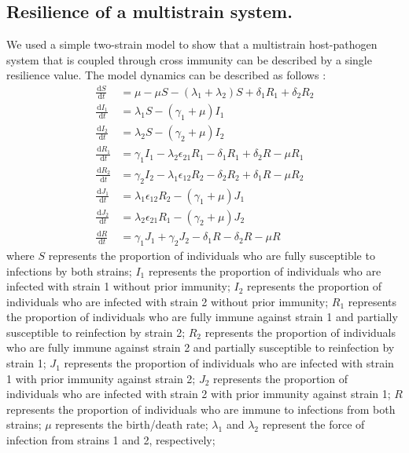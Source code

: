 \documentclass[12pt]{article}
\newcommand{\dd}[1]{\ensuremath{\, \mathrm{d}#1}}
\begin{document}
\subsection*{Resilience of a multistrain system.}

We used a simple two-strain model to show that a multistrain host-pathogen system that is coupled through cross immunity can be described by a single resilience value.
The model dynamics can be described as follows \citep{bhattacharyya2015cross}: 
\begin{align}
\frac{\dd S}{\dd t} &= \mu - \mu S - (\lambda_1 + \lambda_2) S + \delta_1 R_1 + \delta_2 R_2 \\
\frac{\dd I_1}{\dd t} &= \lambda_1 S - (\gamma_1 + \mu) I_1 \\
\frac{\dd I_2}{\dd t} &= \lambda_2 S - (\gamma_2 + \mu) I_2 \\
\frac{\dd R_1}{\dd t} &= \gamma_1 I_1 - \lambda_2 \epsilon_{21} R_1 - \delta_1 R_1 + \delta_2 R - \mu R_1\\
\frac{\dd R_2}{\dd t} &= \gamma_2 I_2 - \lambda_1 \epsilon_{12} R_2 - \delta_2 R_2 + \delta_1 R - \mu R_2\\
\frac{\dd J_1}{\dd t} &= \lambda_1 \epsilon_{12} R_2 - (\gamma_1 + \mu) J_1\\
\frac{\dd J_2}{\dd t} &= \lambda_2 \epsilon_{21} R_1 - (\gamma_2 + \mu) J_2\\
\frac{\dd R}{\dd t} &= \gamma_1 J_1 + \gamma_2 J_2 - \delta_1 R - \delta_2 R - \mu R
\end{align}
where $S$ represents the proportion of individuals who are fully susceptible to infections by both strains;
$I_1$ represents the proportion of individuals who are infected with strain 1 without prior immunity;
$I_2$ represents the proportion of individuals who are infected with strain 2 without prior immunity;
$R_1$ represents the proportion of individuals who are fully immune against strain 1 and partially susceptible to reinfection by strain 2;
$R_2$ represents the proportion of individuals who are fully immune against strain 2 and partially susceptible to reinfection by strain 1;
$J_1$ represents the proportion of individuals who are infected with strain 1 with prior immunity against strain 2;
$J_2$ represents the proportion of individuals who are infected with strain 2 with prior immunity against strain 1;
$R$ represents the proportion of individuals who are immune to infections from both strains;
$\mu$ represents the birth/death rate;
$\lambda_1$ and $\lambda_2$ represent the force of infection from strains 1 and 2, respectively;
\end{document}
